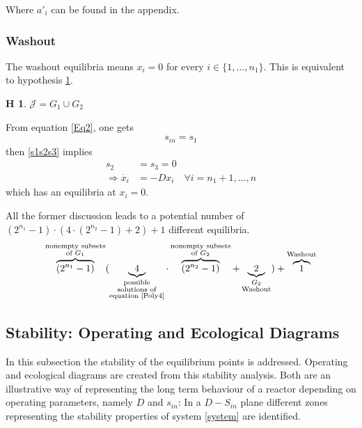 \documentclass[3p,times]{article}
\newtheorem{hypo}{H}
\begin{document}
Where $a'_i$ can be found in the appendix.

\subsubsection{Washout}
	
The washout equilibria means $x_i = 0$ for every $i \in \{1,\dots, n_1\}$. This is equivalent to hypothesis \ref{hypothesis washout}.
\begin{hypo}
	$\mathcal{J} = G_1 \cup G_2$
	\label{hypothesis washout}
\end{hypo} 

From equation \eqref{Eq2}, one gets 
\begin{align*} s_{in} = s_1 \end{align*}
then \eqref{s1s2s3} implies \begin{align*}s_2 &= s_3 = 0 \\ \Rightarrow \dot{x_i} &= -Dx_i \quad \forall i = n_1+1, \dots, n\end{align*}   
which has an equilibria at $x_i = 0$. 

All the former discussion leads to a potential number of   $ (2^{n_1}-1)\cdot (4\cdot(2^{n_2}-1)+2)+1 $  different equilibria. 
\begin{align} \overbrace{(2^{n_1}-1)}^{\substack{\text{nonempty subsets} \\ \text{of }G_1 }} (\underbrace{4}_{\substack{\text{possible} \\ \text{solutions of} \\ \text{equation \eqref{Poly4}}}} \cdot\overbrace{(2^{n_2}-1)}^{\substack{\text{nonempty subsets} \\ \text{of  }G_2}}+\underbrace{2}_{\substack{G_2 \\ \text{Washout}}})+\overbrace{1}^\text{Washout} 
\end{align}

\subsection{Stability: Operating and Ecological Diagrams}

In this subsection the stability of the equilibrium points is addressed. Operating and ecological diagrams are created from this stability analysis. Both are an illustrative way of representing the long term behaviour of a reactor depending on operating parameters, namely $D$ and $s_{in}$: In a $D-S_{in}$ plane different zones representing the stability properties of system \eqref{system} are identified. 
\end{document}

